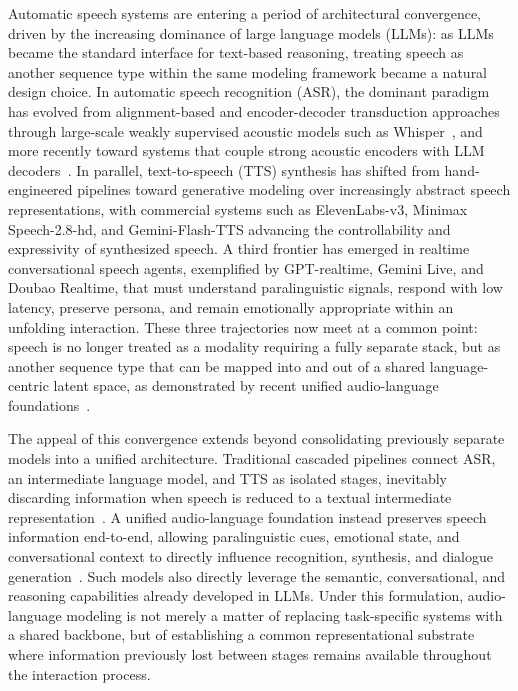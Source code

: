 Automatic speech systems are entering a period of architectural convergence, driven by the increasing dominance of large language models (LLMs): as LLMs became the standard interface for text-based reasoning, treating speech as another sequence type within the same modeling framework became a natural design choice. In automatic speech recognition (ASR), the dominant paradigm has evolved from alignment-based and encoder-decoder transduction approaches~\citep{graves2012connectionist,graves2012sequence,chan2015listen} through large-scale weakly supervised acoustic models such as Whisper~\citep{radford2023robust}, and more recently toward systems that couple strong acoustic encoders with LLM decoders~\citep{peng2026vibevoiceasrtechnicalreport, an2025funasrtechnicalreport, bai2024seed, shi2026qwen3asrtechnicalreport}. In parallel, text-to-speech (TTS) synthesis has shifted from hand-engineered pipelines toward generative modeling over increasingly abstract speech representations, with commercial systems such as ElevenLabs-v3, Minimax Speech-2.8-hd, and Gemini-Flash-TTS advancing the controllability and expressivity of synthesized speech. A third frontier has emerged in realtime conversational speech agents, exemplified by GPT-realtime, Gemini Live, and Doubao Realtime, that must understand paralinguistic signals, respond with low latency, preserve persona, and remain emotionally appropriate within an unfolding interaction. These three trajectories now meet at a common point: speech is no longer treated as a modality requiring a fully separate stack, but as another sequence type that can be mapped into and out of a shared language-centric latent space, as demonstrated by recent unified audio-language foundations~\citep{wu2025stepaudio2technicalreport, xu2025qwen3omnitechnicalreport,liu2026omni}.

The appeal of this convergence extends beyond consolidating previously separate models into a unified architecture. Traditional cascaded pipelines connect ASR, an intermediate language model, and TTS as isolated stages, inevitably discarding information when speech is reduced to a textual intermediate representation~\citep{tang2024salmonn, borsos2023audiolm, cui2025recent}. A unified audio-language foundation instead preserves speech information end-to-end, allowing paralinguistic cues, emotional state, and conversational context to directly influence recognition, synthesis, and dialogue generation~\citep{kim2024paralinguistics, wang2025freezeomni,li2026depflow,xuan2023new,deng2025multi}. Such models also directly leverage the semantic, conversational, and reasoning capabilities already developed in LLMs. Under this formulation, audio-language modeling is not merely a matter of replacing task-specific systems with a shared backbone, but of establishing a common representational substrate where information previously lost between stages remains available throughout the interaction process.

